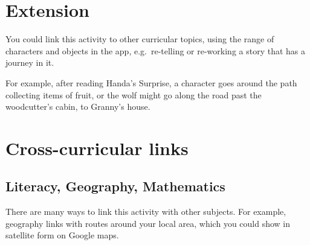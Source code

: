 \documentclass{../../../lessonplan}
\begin{document}
\begin{lessonplan}


\section*{Extension}

You could link this activity to other curricular topics, using the range of characters and objects in the app, e.g.\ re-telling or re-working a story that has a journey in it.

For example, after reading Handa's Surprise, a character goes around the path collecting items of fruit, or the wolf might go along the road past the woodcutter's cabin, to Granny's house.

\section*{Cross-curricular links}

\subsection*{Literacy, Geography, Mathematics}

There are many ways to link this activity with other subjects.
For example, geography links with routes around your local area, which you could show in satellite form on Google maps.

\end{lessonplan}
\end{document}
